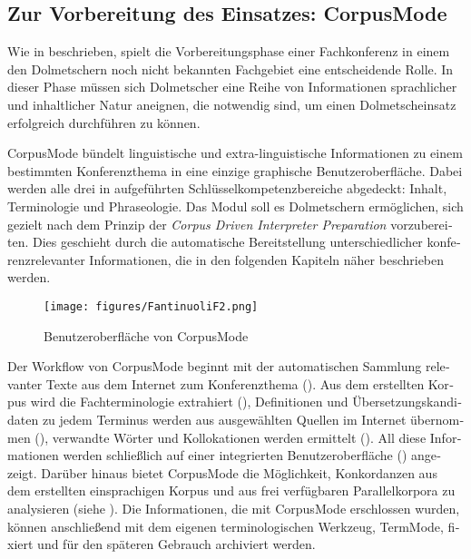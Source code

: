 \documentclass[output=paper]{LSP/langsci}
\begin{document}
\begin{otherlanguage}{ngerman}
\subsection{Zur Vorbereitung des Einsatzes: CorpusMode}\label{sec:fantinuoli:6.1}

Wie in  beschrieben, spielt die Vorbereitungsphase einer Fachkonferenz in einem den Dolmetschern noch nicht bekannten Fachgebiet eine entscheidende Rolle. In dieser Phase müssen sich Dolmetscher eine Reihe von Informationen sprachlicher und inhaltlicher Natur aneignen, die notwendig sind, um einen Dolmetscheinsatz erfolgreich durchführen zu können.

CorpusMode bündelt linguistische und extra-linguistische Informationen zu einem bestimmten Konferenzthema in eine einzige graphische Benutzeroberfläche. Dabei werden alle drei in  aufgeführten Schlüsselkompetenzbereiche abgedeckt: Inhalt, Terminologie und Phraseologie. Das Modul soll es Dolmetschern ermöglichen, sich gezielt nach dem Prinzip der \textit{Corpus Driven Interpreter Preparation} \citep{Fantinuoli2006} vorzubereiten. Dies geschieht durch die automatische Bereitstellung unterschiedlicher konferenzrelevanter Informationen, die in den folgenden Kapiteln näher beschrieben werden.

\begin{figure}
\texttt{[image: figures/FantinuoliF2.png]}
\caption{Benutzeroberfläche von CorpusMode}
\label{fig:fantinuoli:2}
\end{figure} 

Der Workflow von CorpusMode beginnt mit der automatischen Sammlung relevanter Texte aus dem Internet zum Konferenzthema (). Aus dem erstellten Korpus wird die Fachterminologie extrahiert (), Definitionen und Übersetzungskandidaten zu jedem Terminus werden aus ausgewählten Quellen im Internet übernommen (), verwandte Wörter und Kollokationen werden ermittelt (). All diese Informationen werden schließlich auf einer integrierten Benutzeroberfläche () angezeigt. Darüber hinaus bietet CorpusMode die Möglichkeit, Konkordanzen aus dem erstellten einsprachigen Korpus und aus frei verfügbaren Parallelkorpora zu analysieren (siehe ). Die Informationen, die mit CorpusMode erschlossen wurden, können anschließend mit dem eigenen terminologischen Werkzeug, TermMode, fixiert und für den späteren Gebrauch archiviert werden. 


\end{otherlanguage}
\end{document}

